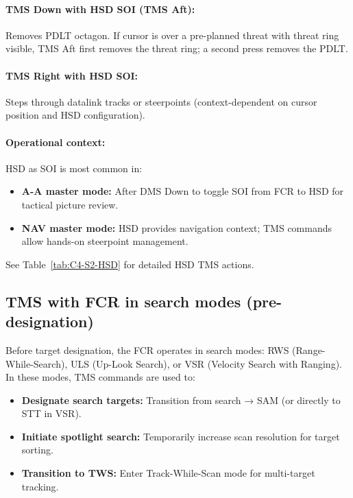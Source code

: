 \documentclass[11pt, a4paper, twoside]{report}
\begin{document}
\paragraph{TMS Down with HSD SOI (TMS Aft):}
Removes PDLT octagon. If cursor is over a pre-planned threat with threat ring visible, TMS Aft first removes the threat ring; a second press removes the PDLT.

\paragraph{TMS Right with HSD SOI:}
Steps through datalink tracks or steerpoints (context-dependent on cursor position and HSD configuration).

\paragraph{Operational context:}
HSD as SOI is most common in:
\begin{itemize}
    \item \textbf{A-A master mode:} After DMS Down to toggle SOI from FCR to HSD for tactical picture review.
    \item \textbf{NAV master mode:} HSD provides navigation context; TMS commands allow hands-on steerpoint management.
\end{itemize}

See Table~\ref{tab:C4-S2-HSD} for detailed HSD TMS actions.

\subsection{TMS with FCR in search modes (pre-designation)}
\label{sec:C4-S2-S2}

Before target designation, the FCR operates in search modes: RWS (Range-While-Search), ULS (Up-Look Search), or VSR (Velocity Search with Ranging). In these modes, TMS commands are used to:
\begin{itemize}
    \item \textbf{Designate search targets:} Transition from search → SAM (or directly to STT in VSR).
    \item \textbf{Initiate spotlight search:} Temporarily increase scan resolution for target sorting.
    \item \textbf{Transition to TWS:} Enter Track-While-Scan mode for multi-target tracking.
\end{itemize}
\end{document}
